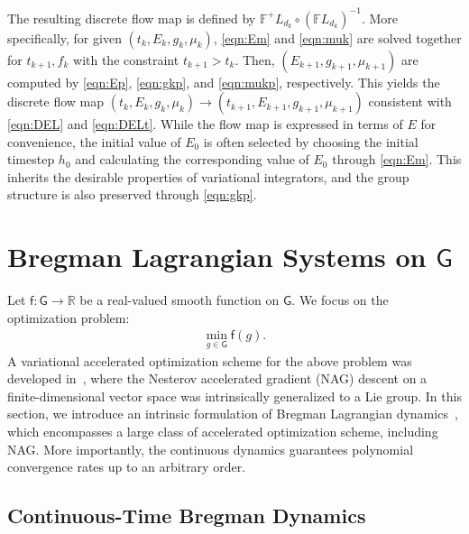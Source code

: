 \documentclass[letterpaper, 10pt, conference]{ieeeconf}
\newcommand{\G}{\ensuremath{\mathsf{G}}}
\renewcommand{\Re}{\ensuremath{\mathbb{R}}}
\newcommand{\g}{\ensuremath{\mathfrak{g}}}
\begin{document}
The resulting discrete flow map is defined by $\mathbb{F}^+L_{d_k} \circ (\mathbb{F}L_{d_k})^{-1}$. 
More specifically, for given $(t_k, E_k, g_k, \mu_k)$, \eqref{eqn:Em} and \eqref{eqn:muk} are solved together for $t_{k+1},f_k$ with the constraint $t_{k+1}>t_k$.
Then, $(E_{k+1}, g_{k+1},\mu_{k+1})$ are computed by \eqref{eqn:Ep}, \eqref{eqn:gkp}, and \eqref{eqn:mukp}, respectively.
This yields the discrete flow map $(t_k, E_k, g_k, \mu_k)\rightarrow(t_{k+1}, E_{k+1}, g_{k+1}, \mu_{k+1})$ consistent with \eqref{eqn:DEL} and \eqref{eqn:DELt}.
While the flow map is expressed in terms of $E$ for convenience, the initial value of $E_0$ is often selected by choosing the initial timestep $h_0$ and calculating the corresponding value of $E_0$ through \eqref{eqn:Em}.
This inherits the desirable properties of variational integrators, and the group structure is also preserved through \eqref{eqn:gkp}.

\section{Bregman Lagrangian Systems on $\G$}\label{sec:Breg}

\newcommand{\obj}{\mathsf{f}}

Let $\obj:\G\rightarrow\Re$ be a real-valued smooth function on $\G$.
We focus on the optimization problem:
\begin{align}
    \min_{g\in\G} \obj (g).
\end{align}
A variational accelerated optimization scheme for the above problem was developed in~\cite{tao2020variational}, where the Nesterov accelerated gradient (NAG) descent on a finite-dimensional vector space was intrinsically generalized to a Lie group. 
In this section, we introduce an intrinsic formulation of Bregman Lagrangian dynamics~\cite{wibisono2016variational}, which encompasses a large class of accelerated optimization scheme, including NAG.
More importantly, the continuous dynamics guarantees polynomial convergence rates up to an arbitrary order.

\subsection{Continuous-Time Bregman Dynamics}
\end{document}
